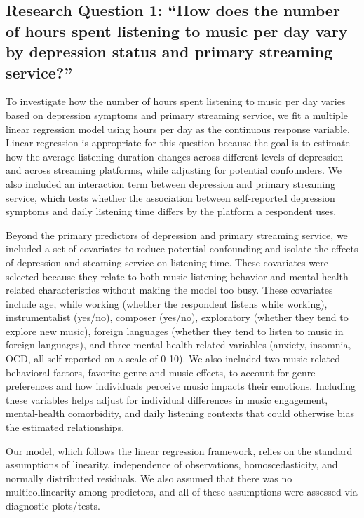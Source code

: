 \documentclass[
  letterpaper,
  DIV=11,
  numbers=noendperiod]{scrartcl}
\begin{document}
\subsection{Research Question 1: ``How does the number of hours spent
listening to music per day vary by depression status and primary
streaming
service?''}\label{research-question-1-how-does-the-number-of-hours-spent-listening-to-music-per-day-vary-by-depression-status-and-primary-streaming-service}

To investigate how the number of hours spent listening to music per day
varies based on depression symptoms and primary streaming service, we
fit a multiple linear regression model using hours per day as the
continuous response variable. Linear regression is appropriate for this
question because the goal is to estimate how the average listening
duration changes across different levels of depression and across
streaming platforms, while adjusting for potential confounders. We also
included an interaction term between depression and primary streaming
service, which tests whether the association between self-reported
depression symptoms and daily listening time differs by the platform a
respondent uses.

Beyond the primary predictors of depression and primary streaming
service, we included a set of covariates to reduce potential confounding
and isolate the effects of depression and steaming service on listening
time. These covariates were selected because they relate to both
music-listening behavior and mental-health-related characteristics
without making the model too busy. These covariates include age, while
working (whether the respondent listens while working), instrumentalist
(yes/no), composer (yes/no), exploratory (whether they tend to explore
new music), foreign languages (whether they tend to listen to music in
foreign languages), and three mental health related variables (anxiety,
insomnia, OCD, all self-reported on a scale of 0-10). We also included
two music-related behavioral factors, favorite genre and music effects,
to account for genre preferences and how individuals perceive music
impacts their emotions. Including these variables helps adjust for
individual differences in music engagement, mental-health comorbidity,
and daily listening contexts that could otherwise bias the estimated
relationships.

Our model, which follows the linear regression framework, relies on the
standard assumptions of linearity, independence of observations,
homoscedasticity, and normally distributed residuals. We also assumed
that there was no multicollinearity among predictors, and all of these
assumptions were assessed via diagnostic plots/tests.
\end{document}
